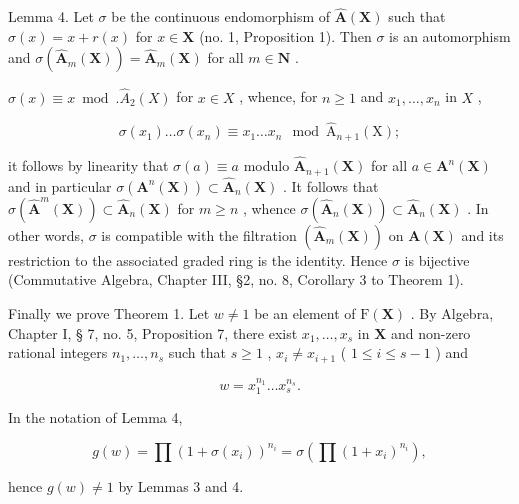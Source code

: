 Lemma 4. Let \(\sigma\) be the continuous endomorphism of \(\hat{\mathbf{A}}(\mathbf{X})\) such that \(\sigma(x) = x + r(x)\) for \(x \in \mathbf{X}\) (no. 1, Proposition 1). Then \(\sigma\) is an automorphism and \(\sigma(\hat{\mathbf{A}}_m(\mathbf{X})) = \hat{\mathbf{A}}_m(\mathbf{X})\) for all \(m \in \mathbf{N}\) .

\(\sigma(x) \equiv x \bmod. \hat{A}_2(X)\) for \(x \in X\) , whence, for \(n \geqslant 1\) and \(x_1, \ldots, x_n\) in \(X\) ,

\[
\sigma (x _ {1}) \dots \sigma (x _ {n}) \equiv x _ {1} \dots x _ {n} \mod \hat {\mathrm{A}} _ {n + 1} (\mathrm{X});
\]

it follows by linearity that \(\sigma(a) \equiv a\) modulo \(\hat{\mathbf{A}}_{n+1}(\mathbf{X})\) for all \(a \in \mathbf{A}^n(\mathbf{X})\) and in particular \(\sigma(\mathbf{A}^n(\mathbf{X})) \subset \hat{\mathbf{A}}_n(\mathbf{X})\) . It follows that \(\sigma(\hat{\mathbf{A}}^m(\mathbf{X})) \subset \hat{\mathbf{A}}_n(\mathbf{X})\) for \(m \geqslant n\) , whence \(\sigma(\hat{\mathbf{A}}_n(\mathbf{X})) \subset \hat{\mathbf{A}}_n(\mathbf{X})\) . In other words, \(\sigma\) is compatible with the filtration \((\hat{\mathbf{A}}_m(\mathbf{X}))\) on \(\mathbf{A}(\mathbf{X})\) and its restriction to the associated graded ring is the identity. Hence \(\sigma\) is bijective (Commutative Algebra, Chapter III, §2, no. 8, Corollary 3 to Theorem 1).

Finally we prove Theorem 1. Let \(w \neq 1\) be an element of \(\mathrm{F}(\mathbf{X})\) . By Algebra, Chapter I, § 7, no. 5, Proposition 7, there exist \(x_{1}, \ldots, x_{s}\) in \(\mathbf{X}\) and non-zero rational integers \(n_{1}, \ldots, n_{s}\) such that \(s \geqslant 1\) , \(x_{i} \neq x_{i+1}\) ( \(1 \leqslant i \leqslant s - 1\) ) and

\[
w = x _ {1} ^ {n _ {1}} \dots x _ {s} ^ {n _ {s}}.
\]

In the notation of Lemma 4,

\[
g (w) = \prod (1 + \sigma (x _ {i})) ^ {n _ {i}} = \sigma (\prod (1 + x _ {i}) ^ {n _ {i}}),
\]

hence \(g(w) \neq 1\) by Lemmas 3 and 4.

